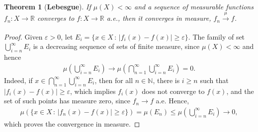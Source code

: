 \documentclass[11pt]{book}
\newtheorem{theorem}{Theorem}[chapter]
\theoremstyle{definition}
\numberwithin{equation}{chapter}
\begin{document}
\begin{theorem}[{\bf Lebesgue}]
If $\mu(X) < \infty$ and a sequence of measurable functions $f_n: X \to \mathbb{R}$ converges to $f: X \to \mathbb{R}$ a.e., then it converges in measure, $f_n \xrightarrow[]{\mu} f$.
\end{theorem}
\begin{proof}
Given $\varepsilon > 0$, let $E_i = \{x \in X \,:\, \left|f_i(x) - f(x)\right| \geq \varepsilon\}$. The family of set $\bigcup^\infty_{i=n} E_i$ is a decreasing sequence of sets of finite measure, since $\mu(X) < \infty$ and hence
\begin{align*}
    \mu\left(\bigcup^\infty_{i=n} E_i\right) \to \mu\left(\bigcap^\infty_{n=1} \bigcup^\infty_{i=n} E_i\right) = 0.
\end{align*}
Indeed, if $x \in \bigcap^\infty_{n=1} \bigcup^\infty_{i=n} E_i$, then for all $n \in \mathbb{N}$, there is $i \geq n$ such that $\left|f_i(x) - f(x)\right| \geq \varepsilon$, which implies $f_i(x)$ does not converge to $f(x)$, and the set of such points has measure zero, since $f_n \to f$ a.e. Hence,
\begin{align*}
    \mu\left(\{x \in X \,:\, \left|f_n(x) - f(x)\right| \geq \varepsilon\}\right) = \mu(E_n) \leq \mu\left(\bigcup^\infty_{i=n} E_i\right) \to 0,
\end{align*}
which proves the convergence in measure.
\end{proof}

\medskip
\end{document}

